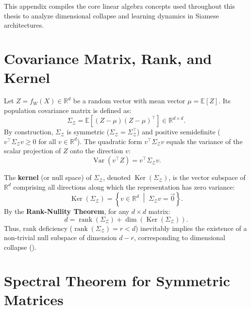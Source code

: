 \documentclass[11pt, oneside, openany]{book}
\DeclareMathOperator{\rank}{rank}
\DeclareMathOperator{\Ker}{Ker}
\DeclareMathOperator{\Var}{Var}
\begin{document}
This appendix compiles the core linear algebra concepts used throughout this thesis to analyze dimensional collapse and learning dynamics in Siamese architectures.

\section{Covariance Matrix, Rank, and Kernel}
\label{sec:B.1}

Let $Z = f_{W}(X) \in \mathbb{R}^{d}$ be a random vector with mean vector $\mu = \mathbb{E}[Z]$. Its population covariance matrix is defined as:
\begin{equation}
\label{eq:B.1}
\Sigma_{\mathcal{Z}} = \mathbb{E}\left[ (Z - \mu)(Z - \mu)^{\top} \right] \in \mathbb{R}^{d \times d}.
\end{equation}
By construction, $\Sigma_{\mathcal{Z}}$ is symmetric ($\Sigma_{\mathcal{Z}} = \Sigma_{\mathcal{Z}}^{\top}$) and positive semidefinite ($v^{\top} \Sigma_{\mathcal{Z}} v \geq 0$ for all $v \in \mathbb{R}^{d}$). The quadratic form $v^{\top} \Sigma_{\mathcal{Z}} v$ equals the variance of the scalar projection of $Z$ onto the direction $v$:
\begin{equation}
\label{eq:B.2}
\Var(v^{\top} Z) = v^{\top} \Sigma_{\mathcal{Z}} v.
\end{equation}

The \textbf{kernel} (or null space) of $\Sigma_{\mathcal{Z}}$, denoted $\Ker(\Sigma_{\mathcal{Z}})$, is the vector subspace of $\mathbb{R}^{d}$ comprising all directions along which the representation has zero variance:
\begin{equation}
\label{eq:B.3}
\Ker(\Sigma_{\mathcal{Z}}) = \left\{ v \in \mathbb{R}^{d} \;\middle|\; \Sigma_{\mathcal{Z}} v = \vec{0} \right\}.
\end{equation}
By the \textbf{Rank-Nullity Theorem}, for any $d \times d$ matrix:
\begin{equation}
\label{eq:B.4}
d = \rank(\Sigma_{\mathcal{Z}}) + \dim(\Ker(\Sigma_{\mathcal{Z}})).
\end{equation}
Thus, rank deficiency ($\rank(\Sigma_{\mathcal{Z}}) = r < d$) inevitably implies the existence of a non-trivial null subspace of dimension $d - r$, corresponding to dimensional collapse ().

\section{Spectral Theorem for Symmetric Matrices}
\label{sec:B.2}
\end{document}
